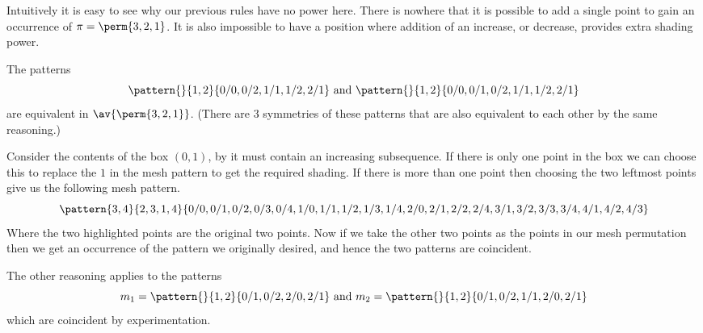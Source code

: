 Intuitively it is easy to see why our previous rules have no
power here. There is nowhere that it is possible to add a single point to
gain an occurrence of \(\pi = \perm{3,2,1}\). It is also impossible to have
a position where addition of an increase, or decrease, provides extra
shading power.

The patterns
\begin{equation*}
    \pattern{}{1,2}{0/0, 0/2, 1/1, 1/2, 2/1} \text { and } \pattern{}{1,2}{0/0, 0/1, 0/2, 1/1, 1/2, 2/1}
\end{equation*}
are equivalent in \(\av{\perm{3,2,1}}\). (There are 3 symmetries of these
patterns that are also equivalent to each other by the same reasoning.)

Consider the contents of the box \((0,1)\), by  it
must contain an increasing subsequence. If there is only one point in the box
we can choose this to replace the \(1\) in the mesh pattern to get the
required shading. If there is more than one point then choosing the
two leftmost points give us the following mesh pattern.
\begin{equation*}
    \pattern{3,4}{2,3,1,4}{0/0, 0/1, 0/2, 0/3, 0/4,
                            1/0, 1/1, 1/2, 1/3, 1/4,
                            2/0, 2/1,2/2, 2/4,
                            3/1, 3/2, 3/3, 3/4,
                            4/1, 4/2, 4/3}
\end{equation*}
Where the two highlighted points are the original two points.
Now if we take the other two points as the points in our
mesh permutation then we get an occurrence of the pattern
we originally desired, and hence the two patterns are coincident.

The other reasoning applies to the patterns
\begin{equation*}
    m_1 = \pattern{}{1,2}{0/1,0/2,2/0,2/1} \text{ and } m_2 = \pattern{}{1,2}{0/1,0/2,1/1,2/0,2/1}
\end{equation*}
which are coincident by experimentation.

